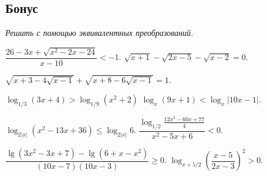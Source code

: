 \subsection*{Бонус}

\emph{Решить с помощью эквивалентных преобразований.}

\begin{problems}

\item
\(
    \dfrac{
        26 - 3 x + \sqrt{x^2 - 2 x - 24}
    }{
        x - 10
    }
<
    -1
\).
\qquad
\problem
$\sqrt{x + 1} - \sqrt{2 x - 5} - \sqrt{x - 2} = 0$.

\item
\(
    \sqrt{x + 3 - 4 \sqrt{x - 1}}
    +
    \sqrt{x + 8 - 6 \sqrt{x - 1}}
=
    1
\).

\item
$\log_{1/3} (3 x + 4) > \log_{1/9} (x^2 + 2)$
\qquad
\problem
$\log_x (9 x + 1) < \log_x |10 x - 1|$.

\item
$\log_{2 |x|} (x^2 - 13 x + 36) \leq \log_{2 |x|} 6$.
\qquad
\problem
\(
    \dfrac{
        \log_{1/2}
            \frac{12 x^2 - 60 x + 77}{4}
    }{
        x^2 - 5 x + 6
    }
<
    0
\).

\item
\(
    \dfrac{
        \lg (3 x^2 - 3 x + 7) - \lg (6 + x - x^2)
    }{
        (10 x - 7) (10 x - 3)
    }
\geq
    0
\).
\qquad
\problem
\(
    \log_{x + 5/2}
        \left(
            \dfrac{x - 5}{2 x - 3}
        \right)^2
>
    0
\).

\end{problems}

